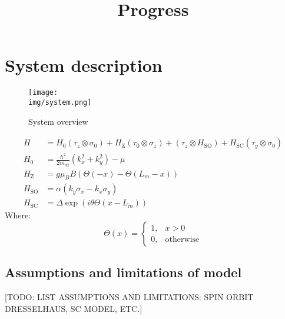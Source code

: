 \documentclass[10pt,a4paper]{article}
\newcommand{\kx}{k_x}
\newcommand{\ky}{k_y}
\newcommand{\meff}{m_\text{eff}}
\newcommand{\img}{./images}
\begin{document}
\title{Progress}
\maketitle
\section{System description}
	\begin{figure}[H]
		\texttt{[image: \\img/system.png]}
		\caption{System overview}
	\end{figure}
	
	\begin{align}
		H &= H_0(\tau_z \otimes \sigma_0) + 
		H_\text{Z} (\tau_0 \otimes \sigma_z) +
		(\tau_z \otimes H_\text{SO}) +
	 H_\text{SC}(\tau_y \otimes \sigma_0) \\
		H_0 &= \frac{\hbar^2}{2\meff}\left(\kx^2 + \ky^2\right) - \mu \\
		H_\text{Z} &= g \mu_B B  \left(\Theta(-x) - \Theta(L_m-x)\right)  \\
		H_\text{SO} &= \alpha \left( \ky \sigma_x - \kx \sigma_y \right)\\
		H_\text{SC} &= \Delta \exp \left(i \theta \Theta(x-L_m) \right)
	\end{align}
	Where: 
	\begin{equation}
	\Theta(x) = 
	\begin{cases}
	1,& x>0\\
	0,& \text{otherwise}
	\end{cases}
	\end{equation}
	\subsection{Assumptions and limitations of model}
		[TODO: LIST ASSUMPTIONS AND LIMITATIONS: SPIN ORBIT DRESSELHAUS, SC MODEL, ETC.]
\end{document}
